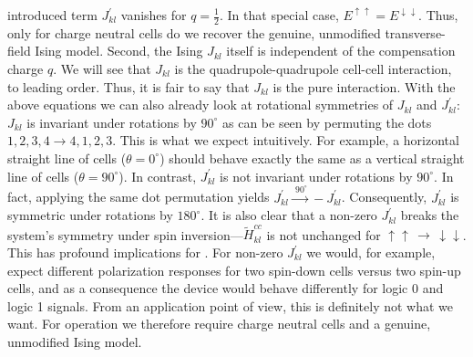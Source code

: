 introduced term $J^{\prime}_{kl}$ vanishes for $q=\frac{1}{2}$. In that special
case, $E^{\uparrow\uparrow} = E^{\downarrow\downarrow}$. Thus, only for charge
neutral cells do we recover the genuine, unmodified transverse-field Ising
model. Second, the Ising $J_{kl}$ itself is independent of the compensation
charge $q$. We will see that $J_{kl}$ is the quadrupole-quadrupole cell-cell
interaction, to leading order. Thus, it is fair to say that $J_{kl}$ is the pure
 interaction. With the above equations we can also already look at
rotational symmetries of $J_{kl}$ and $J^{\prime}_{kl}$: $J_{kl}$ is invariant
under rotations by $90^{\circ}$ as can be seen by permuting the dots $1,2,3,4
\rightarrow 4,1,2,3$. This is what we expect intuitively. For example, a
horizontal straight line of cells ($\theta = 0^{\circ}$) should behave exactly
the same as a vertical straight line of cells ($\theta = 90^{\circ}$). In
contrast, $J^{\prime}_{kl}$ is not invariant under rotations by $90^{\circ}$. In
fact, applying the same dot permutation yields $J^{\prime}_{kl}
\xrightarrow{\,\, 90^{\circ}} - J^{\prime}_{kl}$. Consequently,
$J^{\prime}_{kl}$ is symmetric under rotations by $180^{\circ}$. It is also
clear that a non-zero $J^{\prime}_{kl}$ breaks the system's symmetry under spin
inversion---$\tilde{H}^{cc}_{kl}$ is not unchanged for $\uparrow\uparrow \,
\rightarrow \, \downarrow\downarrow$. This has profound implications for
. For non-zero $J^{\prime}_{kl}$ we would, for example, expect
different polarization responses for two spin-down cells versus two spin-up
cells, and as a consequence the device would behave differently for logic 0 and
logic 1 signals. From an application point of view, this is definitely not what
we want. For  operation we therefore require charge neutral cells and
a genuine, unmodified Ising model.

